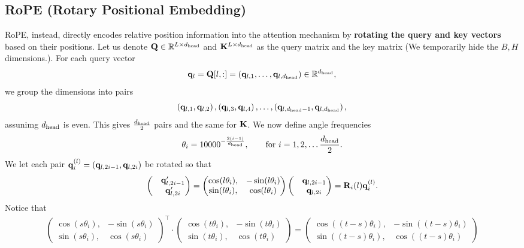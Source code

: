 \documentclass[11pt]{article}  %
\begin{document}
\subsection{RoPE (Rotary Positional Embedding)}
RoPE, instead, directly encodes relative position information into the attention mechanism by \textbf{rotating the query and key vectors} based on their positions.
Let us denote $\mathbf{Q} \in \mathbb{R}^{L \times d_{\text{head}}}$ and $\mathbf{K}^{L \times d_{\text{head}}}$ as the query matrix and the key matrix (We temporarily hide the $B, H$ dimensions.).
For each query vector 
\begin{align}
  \mathbf{q}_l = \mathbf{Q}[l, :] = \left( \mathbf{q}_{l,1}, \hdots, \mathbf{q}_{l,d_{\text{head}}} \right) \in \mathbb{R}^{d_{\text{head}}}, 
\end{align}
we group the dimensions into pairs 
\begin{align}
  \left( \mathbf{q}_{l,1}, \mathbf{q}_{l,2} \right), \left( \mathbf{q}_{l,3}, \mathbf{q}_{l,4} \right), \hdots, \left( \mathbf{q}_{l,d_{\text{head}} - 1}, \mathbf{q}_{l, d_{\text{head}}} \right),
\end{align}
assunimg $d_{\text{head}}$ is even.
This gives $\frac{d_{\text{head}}}{2}$ pairs and the same for $\mathbf{K}$.
We now define angle frequencies 
\begin{align*}
  \theta_i = 10000^{-\frac{2(i - 1)}{d_{\text{head}}}}, \qquad \text{for } i = 1,2, \hdots \frac{d_{\text{head}}}{2}.
\end{align*}
We let each pair $\mathbf{q}_i^{(l)} = (\mathbf{q}_{l, 2i - 1}, \mathbf{q}_{l, 2i})$ be rotated so that 
\begin{align*}
  \begin{pmatrix}
    &\mathbf{q}_{l, 2i-1}^\prime \\
    &\mathbf{q}_{l, 2i}^\prime
  \end{pmatrix}
  = \begin{pmatrix}
    \cos(l\theta_i), & -\sin(l\theta_i) \\
    \sin(l\theta_i), & \cos(l\theta_i)
  \end{pmatrix}
  \begin{pmatrix}
    &\mathbf{q}_{l, 2i-1} \\
    &\mathbf{q}_{l, 2i}
  \end{pmatrix} = \mathbf{R}_i(l) \mathbf{q}_i^{(l)}.
\end{align*}
Notice that 
\begin{align*}
  \begin{pmatrix}
    \cos(s\theta_i), & -\sin(s\theta_i) \\
    \sin(s\theta_i), & \cos(s\theta_i)
  \end{pmatrix}^{\top} \cdot \begin{pmatrix}
    \cos(t\theta_i), & -\sin(t\theta_i) \\
    \sin(t\theta_i), & \cos(t\theta_i)
  \end{pmatrix} = \begin{pmatrix}
    \cos((t-s)\theta_i), & -\sin((t-s)\theta_i) \\
    \sin((t-s)\theta_i), & \cos((t-s)\theta_i)
  \end{pmatrix}
\end{align*}
\end{document}
